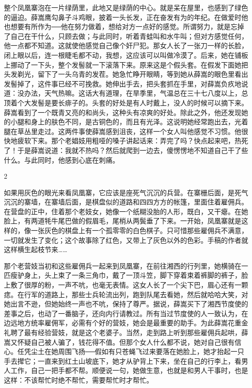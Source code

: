 整个凤凰寨泡在一片绿荫里，此地又是绿荫的中心。就是呆在屋里，也感到了绿色的逼迫。薛嵩鹰勾鼻子斗鸡眼，披着一头长发，正在奋发有为的年纪。在做爱时他也想要有所作为──他在努力做着，想给对方一点好的感觉。所谓努力，就是忘掉了自己在干什么，只顾去做；与此同时，听着青蛙叫和水牛叫；但对方感觉任何，他一点都不知道。这就使他感觉自己像个奸尸犯。那女人长了一张刀一样的长脸，闭上眼以后，连一根睫毛都不动，我想，这应该可以叫做冷漠了。后来，她在铺板上挪动了一下头，整个发髻就一下滚落下来。原来这是个假头套。在假发下面她把头发剃光，留下了一头乌青的发茬。她急忙睁开眼睛，等到她从薛嵩的眼色里看出发髻掉了，这件事已经不可挽救。她伸出手去，把头套抓在手里，对薛嵩负疚地说道：没办法，天气热嘛。这话大有道理，在旱季里，气温总在三十七八度以上，总顶着个大发髻是要长痱子的。头套的好处是有人时戴上，没人的时候可以摘下来。薛嵩看到了一个既青又亮的和尚头，这种头有凉爽的好处。除此之外，他还发现她的小腿和身上的肤色不同，是古铜色的，而且有光泽。这说明她经常跑出去，光着腿在草丛里走过。这两件事使薛嵩感到沮丧，这样一个女人叫他感觉不习惯。他很快地疲软下来。那个老娼妓用粗哑的嗓子讲起话来：弄完了吗？快点起来吧，热死了！于是薛嵩说道：我就不热吗？然后就爬到一边去，傻愣愣地不知道自己干了些什么。与此同时，他感到心底在刺痛。 

2 

如果用灰色的眼光来看凤凰寨，它应该是座死气沉沉的兵营。在寨栅后面，是死气沉沉的寨墙，在寨墙后面，是棋盘似的道路和四四方方的帐篷，里面住着雇佣兵。在营盘的正中，住着那个老妓女，她像一个纸糊没胎的人形，既白，又干瘪。在她脸上，有两道牦牛尾巴做的假眉毛，尾梢从两鬓垂了下来。一开始，凤凰寨就是这样的，像一张灰色的棋盘上有一个孤零零的白色棋子。只可惜那些雇佣兵不满意，一切就发生了变化；这个故事除了红色，又带上了灰色以外的色彩。手稿的作者就这样横生起枝节来…… 

那个老营妓当初和这些雇佣兵一起来到凤凰寨，在前往湘西的行列里，她横骑在一匹瘦驴身上，头上束了一条三角巾，戴了一顶斗笠，脚下穿着束着裤脚的裤子，脸上敷了很厚的粉，一声不吭，也毫无表情。这女人长了一个尖下巴，眉心还有一颗痣。在行军的道路上，那些士兵轮流出列，跑到队尾去看她，然后就哈哈大笑，对她出言不逊，但她始终一声也不吭，保持了尊严。据说，薛嵩买下了湘西节度使的差事之后，也动了一番脑子，还向内行请教过。所有当过节度使的人一致认为，在边远地方统率雇佣军，必需有个好的营妓，她会是最重要的助手。为此薛嵩花重金礼聘了最有经验营妓，就是这个老婆子。当然，走到路上听到那些雇佣兵起哄，薛嵩又怀疑自己被人骗了，钱花得不值。但那个女人什么都不说，她对自己很有信心。任凭尘土在她周围飞扬──假如有只苍蝇飞过来要落在她脸上，她才抬起一只手去撵它；一直来到红土山坡底下，她才从驴背上下来，坐在自己的行李上，看男人工作，自己一把手都不帮。顺便说一句，她做生意，也就是和男人干事时，也是这样：不该帮忙时绝不帮忙，需要帮忙时才帮忙。 

